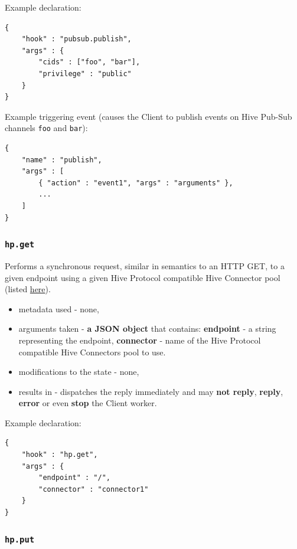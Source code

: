 \documentclass[a4paper]{article}
\begin{document}
\noindent
Example declaration:

\begin{verbatim}
{
    "hook" : "pubsub.publish",
    "args" : {
        "cids" : ["foo", "bar"],
        "privilege" : "public"
    }
}
\end{verbatim}




\noindent
Example triggering event (causes the Client to publish events on Hive Pub-Sub channels \texttt{foo} and \texttt{bar}):


\begin{verbatim}
{
    "name" : "publish",
    "args" : [
        { "action" : "event1", "args" : "arguments" },
        ...
    ]
}
\end{verbatim}
\subsubsection{\texttt{hp.get}}
\label{sec-9-2-7}
\label{ref-hive_protocol_hook}

Performs a synchronous request, similar in semantics to an HTTP GET, to a given endpoint using a given Hive Protocol compatible Hive Connector pool (listed \hyperref[ref-cp_connector]{here}).


\begin{itemize}
\item metadata used - none,
\item arguments taken - \textbf{a JSON object} that contains: \textbf{endpoint} - a string representing the endpoint, \textbf{connector} - name of the Hive Protocol compatible Hive Connectors pool to use.
\item modifications to the state - none,
\item results in - dispatches the reply immediately and may \textbf{not reply}, \textbf{reply}, \textbf{error} or even \textbf{stop} the Client worker.
\end{itemize}

\noindent
Example declaration:

\begin{verbatim}
{
    "hook" : "hp.get",
    "args" : {
        "endpoint" : "/",
        "connector" : "connector1"
    }
}
\end{verbatim}
\subsubsection{\texttt{hp.put}}
\label{sec-9-2-8}
\end{document}
